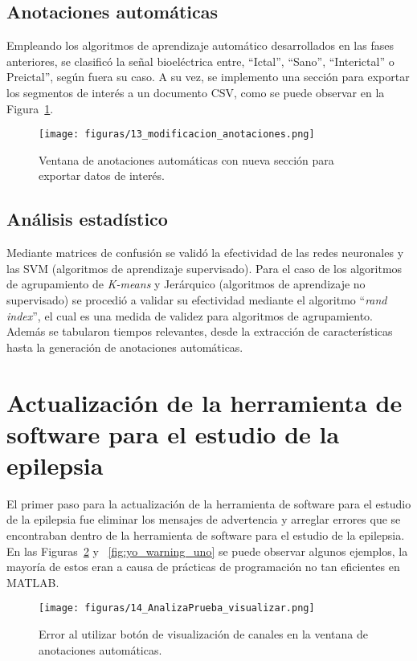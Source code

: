 \subsection{Anotaciones automáticas}
Empleando los algoritmos de aprendizaje automático desarrollados en las fases anteriores, se clasificó la señal bioeléctrica entre, ``Ictal'', ``Sano'', ``Interictal'' o Preictal'', según fuera su caso. A su vez, se implemento una sección para exportar los segmentos de interés a un documento CSV, como se puede observar en la Figura~\ref{fig:yo_anotaciones}.

\begin{figure}[H]
    \centering
    \texttt{[image: figuras/13\_modificacion\_anotaciones.png]}
    \caption{Ventana de anotaciones automáticas con nueva sección para exportar datos de interés.}
    \label{fig:yo_anotaciones}
\end{figure}

\subsection{Análisis estadístico}
Mediante matrices de confusión se validó la efectividad de las redes neuronales y las SVM (algoritmos de aprendizaje supervisado). Para el caso de los algoritmos de agrupamiento de \textit{K-means} y Jerárquico (algoritmos de aprendizaje no supervisado) se procedió a validar su efectividad mediante el algoritmo ``\textit{rand index}'', el cual es una medida de validez para algoritmos de agrupamiento. Además se tabularon tiempos relevantes, desde la extracción de características hasta la generación de anotaciones automáticas. 

\section{Actualización de la herramienta de software para el estudio de la epilepsia}
El primer paso para la actualización de la herramienta de software para el estudio de la epilepsia fue eliminar los mensajes de advertencia y arreglar errores que se encontraban dentro de la herramienta de software para el estudio de la epilepsia. En las Figuras~\ref{fig:yo_error_uno} y ~\ref{fig:yo_warning_uno} se puede observar algunos ejemplos, la mayoría de estos eran a causa de prácticas de programación no tan eficientes en MATLAB. 

\begin{figure}[t]
    \centering
    \texttt{[image: figuras/14\_AnalizaPrueba\_visualizar.png]}
    \caption{Error al utilizar botón de visualización de canales en la ventana de anotaciones automáticas.}
    \label{fig:yo_error_uno}
\end{figure}

